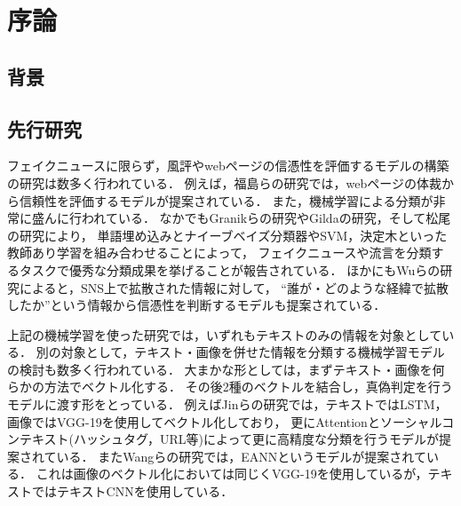 \chapter{序論}
%
\section{背景}


\section{先行研究}
フェイクニュースに限らず，風評やwebページの信憑性を評価するモデルの構築の研究は数多く行われている．
例えば，福島らの研究\cite{fuk}では，webページの体裁から信頼性を評価するモデルが提案されている．
また，機械学習による分類が非常に盛んに行われている．
なかでもGranikらの研究\cite{gra}やGildaの研究\cite{gil}，そして松尾の研究\cite{mat}により，
単語埋め込みとナイーブベイズ分類器やSVM，決定木といった教師あり学習を組み合わせることによって，
フェイクニュースや流言を分類するタスクで優秀な分類成果を挙げることが報告されている．
ほかにもWuらの研究\cite{wu}によると，SNS上で拡散された情報に対して，
``誰が・どのような経緯で拡散したか''という情報から信憑性を判断するモデルも提案されている． 

上記の機械学習を使った研究では，いずれもテキストのみの情報を対象としている．
別の対象として，テキスト・画像を併せた情報を分類する機械学習モデルの検討も数多く行われている．
大まかな形としては，まずテキスト・画像を何らかの方法でベクトル化する．
その後2種のベクトルを結合し，真偽判定を行うモデルに渡す形をとっている．
例えばJinらの研究\cite{jin}では，テキストではLSTM，画像ではVGG-19を使用してベクトル化しており，
更にAttentionとソーシャルコンテキスト(ハッシュタグ，URL等)によって更に高精度な分類を行うモデルが提案されている．
またWangらの研究\cite{eann}では，EANNというモデルが提案されている．
これは画像のベクトル化においては同じくVGG-19を使用しているが，テキストではテキストCNNを使用している．

